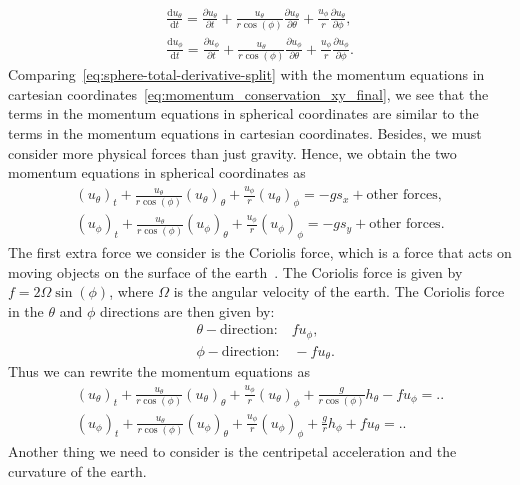 \begin{equation}\label{eq:sphere-total-derivative-split}
    \begin{aligned}
        \frac{\text{d}u_\theta}{\text{d}t} = \frac{\partial u_\theta}{\partial t} + \frac{u_\theta}{r \cos(\phi)} \frac{\partial u_\theta}{\partial \theta} + \frac{u_\phi}{r} \frac{\partial u_\theta}{\partial \phi}, \\
        \frac{\text{d}u_\phi}{\text{d}t} = \frac{\partial u_\phi}{\partial t} + \frac{u_\theta}{r \cos(\phi)} \frac{\partial u_\phi}{\partial \theta} + \frac{u_\phi}{r} \frac{\partial u_\phi}{\partial \phi}.
    \end{aligned}
\end{equation}
Comparing~\eqref{eq:sphere-total-derivative-split} with the momentum equations in cartesian coordinates~\eqref{eq:momentum_conservation_xy_final}, we see that the terms in the momentum equations in spherical coordinates are similar to the terms in the momentum equations in cartesian coordinates.
Besides, we must consider more physical forces than just gravity.
Hence, we obtain the two momentum equations in spherical coordinates as
\begin{equation}
    \begin{aligned}
         {(u_\theta)}_t + \frac{u_\theta}{r \cos(\phi)} {(u_\theta)}_\theta + \frac{u_\phi}{r} {(u_\theta)}_\phi = -g s_x + \text{other forces}, \\
        {( u_\phi)}_t + \frac{u_\theta}{r \cos(\phi)} {(u_\phi)}_\theta   + \frac{u_\phi}{r} {(u_\phi)}_\phi = - g s_y + \text{other forces}.
    \end{aligned}
\end{equation}
The first extra force we consider is the Coriolis force, which is a force that acts on moving objects on the surface of the earth~\cite{Coriolis}.
The Coriolis force is given by $f = 2 \Omega \sin(\phi)$, where $\Omega$ is the angular velocity of the earth.
The Coriolis force in the $\theta$ and $\phi$ directions are then given by:
\begin{align*}
    &\theta-\text{direction:} \quad f u_\phi,\\
    &\phi-\text{direction:} \quad -f u_\theta.
\end{align*}
Thus we can rewrite the momentum equations as
\begin{equation}
    \begin{aligned}
         {(u_\theta)}_t + \frac{u_\theta}{r \cos(\phi)} {(u_\theta)}_\theta + \frac{u_\phi}{r} {(u_\theta)}_\phi + \frac{g}{r \cos(\phi)} h_\theta - f u_\phi = .. \\
        {( u_\phi)}_t + \frac{u_\theta}{r \cos(\phi)} {(u_\phi)}_\theta   + \frac{u_\phi}{r} {(u_\phi)}_\phi + \frac{g}{r} h_\phi + f u_\theta = ..
    \end{aligned}
\end{equation}
Another thing we need to consider is the centripetal acceleration and the curvature of the earth.



